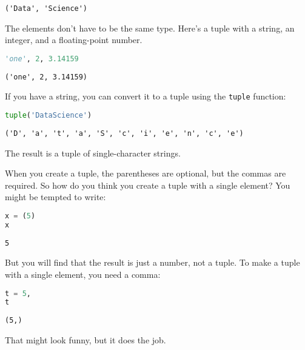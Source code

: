 \begin{lstlisting}[style=output]
('Data', 'Science')
\end{lstlisting}

The elements don't have to be the same type. Here's a tuple with a
string, an integer, and a floating-point number.

\begin{lstlisting}[language=Python,style=source]
'one', 2, 3.14159 
\end{lstlisting}

\begin{lstlisting}[style=output]
('one', 2, 3.14159)
\end{lstlisting}

If you have a string, you can convert it to a tuple using the
\passthrough{\lstinline!tuple!} function:

\begin{lstlisting}[language=Python,style=source]
tuple('DataScience')
\end{lstlisting}

\begin{lstlisting}[style=output]
('D', 'a', 't', 'a', 'S', 'c', 'i', 'e', 'n', 'c', 'e')
\end{lstlisting}

The result is a tuple of single-character strings.

When you create a tuple, the parentheses are optional, but the commas
are required. So how do you think you create a tuple with a single
element? You might be tempted to write:

\begin{lstlisting}[language=Python,style=source]
x = (5)
x
\end{lstlisting}

\begin{lstlisting}[style=output]
5
\end{lstlisting}

But you will find that the result is just a number, not a tuple. To make
a tuple with a single element, you need a comma:

\begin{lstlisting}[language=Python,style=source]
t = 5,
t
\end{lstlisting}

\begin{lstlisting}[style=output]
(5,)
\end{lstlisting}

That might look funny, but it does the job.

